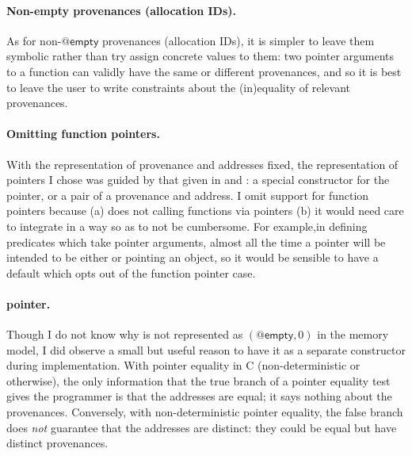 \paragraph{Non-empty provenances (allocation IDs).}%
As for non-$@\mathsf{empty}$ provenances (allocation IDs), it is simpler to
leave them symbolic rather than try assign concrete values to them: two pointer
arguments to a function can validly have the same or different provenances, and
so it is best to leave the user to write constraints about the (in)equality of %
relevant provenances.

\paragraph{Omitting function pointers.}%
With the representation of provenance and addresses fixed, the representation
of pointers I chose was guided by that given in  and :
a special constructor for the  pointer, or a pair of a
provenance and address. I omit support for function pointers
because (a)  does not calling functions via pointers (b) it would need
care to integrate in a way so as to not be cumbersome. For example,in defining
predicates which take pointer arguments, almost all the time a pointer will be
intended to be either  or pointing an object, so it would be sensible to
have a default which opts out of the function pointer case.

\paragraph{ pointer.}%
Though I do not know why  is not represented as
$(@\mathsf{empty}, 0)$ in the memory model, I did observe a
small but useful reason to have it as a separate constructor during
implementation. With pointer equality in C (non-deterministic or otherwise),
the only information that the true branch of a pointer equality test gives the
programmer is that the addresses are equal; it says nothing about the
provenances. Conversely, with non-deterministic pointer equality, the false
branch does \emph{not} guarantee that the addresses are distinct: they could be
equal but have distinct provenances.

